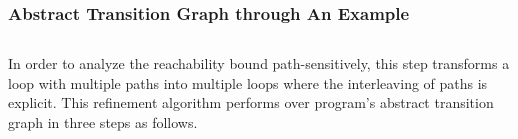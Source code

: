 \subsubsection{Abstract Transition Graph through An Example }
\label{sec:abs_prog_example}
% 
%

%
\subsection{}
\label{sec:refine}
In order to analyze the reachability bound path-sensitively, 
this step transforms a loop with multiple paths 
into multiple loops where the interleaving of paths is explicit.
This refinement algorithm performs over program's abstract transition graph in three steps as follows.
%
